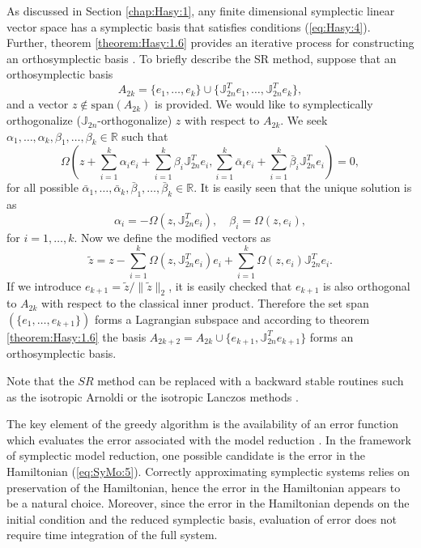 {\edit
As discussed in Section \ref{chap:Hasy:1}, any finite dimensional symplectic linear vector space has a symplectic basis that satisfies conditions (\ref{eq:Hasy:4}). Further, theorem \ref{theorem:Hasy:1.6} provides an iterative process for constructing an orthosymplectic basis \cite{Matsuo:2014wl,Salam2014}. To briefly describe the SR method, suppose that an orthosymplectic basis
\begin{equation} \label{eq:SyMo:14.1}
	A_{2k}=\{ e_1 , \dots , e_k \} \cup \{ \mathbb J_{2n}^T e_1 , \dots , \mathbb J_{2n}^T e_k \},
\end{equation}
and a vector $z\not \in \text{span}(A_{2k})$ is provided. We would like to symplectically orthogonalize ($\mathbb J_{2n}$-orthogonalize) $z$ with respect to $A_{2k}$. We seek $\alpha_1,\dots,\alpha_k,\beta_1,\dots,\beta_k \in \mathbb R$ such that
\begin{equation} \label{eq:SyMo:14.2}
	\Omega\left(z + \sum_{i=1}^k \alpha_i e_i + \sum_{i=1}^k \beta_i \mathbb J_{2n}^Te_i , \sum_{i=1}^k \bar{\alpha}_i e_i + \sum_{i=1}^k \bar{\beta}_i \mathbb J_{2n}^Te_i \right) = 0,
\end{equation}
for all possible $\bar{\alpha}_1,\dots,\bar{\alpha}_k,\bar{\beta}_1,\dots,\bar{\beta}_k \in \mathbb R$. It is easily seen that the unique solution is as 
\begin{equation} \label{eq:SyMo:14.3}
	\alpha_i = - \Omega(z,\mathbb J_{2n}^Te_i), \quad \beta_i = \Omega(z,e_i),
\end{equation}
for $i=1,\dots,k$. Now we define the modified vectors as
\begin{equation} \label{eq:SyMo:14.4}
	\tilde z = z - \sum_{i=1}^k \Omega(z,\mathbb J_{2n}^Te_i) e_i + \sum_{i=1}^k \Omega(z,e_i) \mathbb J_{2n}^Te_i.
\end{equation}
If we introduce $e_{k+1} = \tilde z / \| \tilde z \|_2$, it is easily checked that $e_{k+1}$ is also orthogonal to $A_{2k}$ with respect to the classical inner product. Therefore the set span$(\{e_1,\dots,e_{k+1}\})$ forms a Lagrangian subspace and according to theorem \ref{theorem:Hasy:1.6} the basis $A_{2k+2}= A_{2k}\cup \{ e_{k+1} , \mathbb J_{2n}^T e_{k+1} \}$ forms an orthosymplectic basis.

Note that the $SR$ method can be replaced with a backward stable routines such as the isotropic Arnoldi or the isotropic Lanczos methods \cite{Mehrmann:2000dv}.
}

The key element of the greedy algorithm is the availability of an error function which evaluates the error associated with the model reduction \cite{Anonymous:2016wl}. In the framework of symplectic model reduction, one possible candidate is the error in the Hamiltonian (\ref{eq:SyMo:5}). Correctly approximating symplectic systems relies on preservation of the Hamiltonian, hence the error in the Hamiltonian appears to be a natural choice. Moreover, since the error in the Hamiltonian depends on the initial condition and the reduced symplectic basis, evaluation of error does not require time integration of the full system. 

